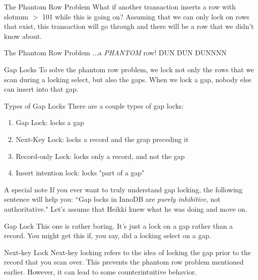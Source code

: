 \documentclass[14pt]{beamer}
\begin{document}
\begin{frame}{The Phantom Row Problem}
  What if another transaction inserts a row with slotnum $>$ 101 while this is
  going on? Assuming that we can only lock on rows that exist, this transaction
  will go through and there will be a row that we didn't know about.
\end{frame}

\begin{frame}{The Phantom Row Problem}
  ...a \emph{PHANTOM} row! DUN DUN DUNNNN
\end{frame}

\begin{frame}{Gap Locks}
  To solve the phantom row problem, we lock not only the rows that we scan
  during a locking select, but also the gaps. When we lock a gap, nobody else
  can insert into that gap.
\end{frame}

\begin{frame}{Types of Gap Locks}
  There are a couple types of gap locks:
  \begin{enumerate}
  \item Gap Lock: locks a gap
  \item Next-Key Lock: locks a record and the grap preceding it
  \item Record-only Lock: locks only a record, and not the gap
  \item Insert intention lock: locks "part of a gap"
  \end{enumerate}
\end{frame}

\begin{frame}{A special note}
  If you ever want to truly understand gap locking, the following sentence will
  help you: ``Gap locks in InnoDB are \emph{purely inhibitive}, not
  authoritative." Let's assume that Heikki knew what he was doing and move on.
\end{frame}

\begin{frame}{Gap Lock}
  This one is rather boring. It's just a lock on a gap rather than a record. You
  might get this if, you say, did a locking select on a gap.
\end{frame}

\begin{frame}{Next-key Lock}
  Next-key locking refers to the idea of locking the gap prior to the record
  that you scan over. This prevents the phantom row problem mentioned earlier.
  However, it can lead to some counterintuitive behavior.
\end{frame}
\end{document}
